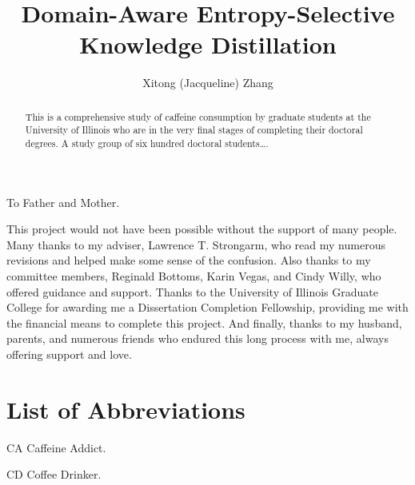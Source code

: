 \documentclass[draft]{uiucthesis2021}
\begin{document}
\title{Domain-Aware Entropy-Selective Knowledge
Distillation}
\author{Xitong (Jacqueline) Zhang}
\msthesis
{}
\maketitle

\frontmatter

\begin{abstract}
This is a comprehensive study of caffeine consumption by graduate
students at the University of Illinois who are in the very final
stages of completing their doctoral degrees. A study group of six
hundred doctoral students\ldots.
\end{abstract}

\begin{dedication}
To Father and Mother.
\end{dedication}

\begin{acknowledgments}
This project would not have been possible without the support of
many people. Many thanks to my adviser, Lawrence T. Strongarm, who
read my numerous revisions and helped make some sense of the
confusion. Also thanks to my committee members, Reginald Bottoms,
Karin Vegas, and Cindy Willy, who offered guidance and support.
Thanks to the University of Illinois Graduate College for awarding
me a Dissertation Completion Fellowship, providing me with the
financial means to complete this project. And finally, thanks to
my husband, parents, and numerous friends who endured this long
process with me, always offering support and love.
\end{acknowledgments}

{
    \hypersetup{linkcolor=black}  %
    \tableofcontents
}

\chapter{List of Abbreviations}

\begin{abbrevlist}
\item[CA] Caffeine Addict.
\item[CD] Coffee Drinker.
\end{abbrevlist}
\end{document}
